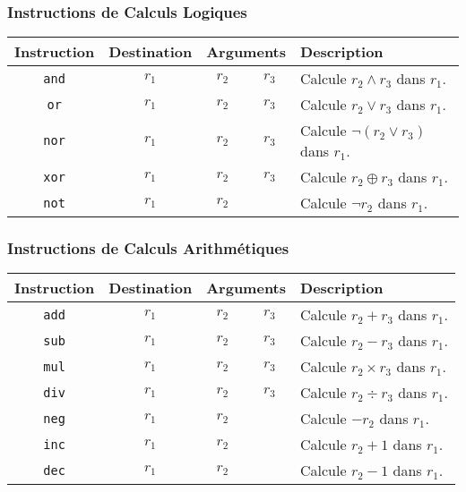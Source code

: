 \documentclass[french, 12pt]{article}
\begin{document}
\renewcommand\tabularxcolumn[1]{m{#1}}
\renewcommand{\arraystretch}{1.5}

\subsubsection*{Instructions de Calculs Logiques}
\noindent
\begin{tabularx}{\textwidth}{cccc X}
      \toprule
      Instruction  & Destination & \multicolumn{2}{c}{Arguments} & Description                                             \\
      \midrule
      \texttt{and} & $r_1$       & $r_2$                         & $r_3$       & Calcule $r_2 \land r_3$ dans $r_1$.       \\
      \texttt{or}  & $r_1$       & $r_2$                         & $r_3$       & Calcule $r_2 \lor r_3$ dans $r_1$.        \\
      \texttt{nor} & $r_1$       & $r_2$                         & $r_3$       & Calcule $\neg (r_2 \lor r_3)$ dans $r_1$. \\
      \texttt{xor} & $r_1$       & $r_2$                         & $r_3$       & Calcule $r_2 \oplus r_3$ dans $r_1$.      \\
      \texttt{not} & $r_1$       & $r_2$                         &             & Calcule $\neg r_2$ dans $r_1$.            \\
      \bottomrule
\end{tabularx}

\subsubsection*{Instructions de Calculs Arithmétiques}

\noindent
\begin{tabularx}{\textwidth}{cccc X}
      \toprule
      Instruction  & Destination & \multicolumn{2}{c}{Arguments} & Description                                        \\
      \midrule
      \texttt{add} & $r_1$       & $r_2$                         & $r_3$       & Calcule $r_2 + r_3$ dans $r_1$.      \\
      \texttt{sub} & $r_1$       & $r_2$                         & $r_3$       & Calcule $r_2 - r_3$ dans $r_1$.      \\
      \texttt{mul} & $r_1$       & $r_2$                         & $r_3$       & Calcule $r_2 \times r_3$ dans $r_1$. \\
      \texttt{div} & $r_1$       & $r_2$                         & $r_3$       & Calcule $r_2 \div r_3$ dans $r_1$.   \\
      \texttt{neg} & $r_1$       & $r_2$                         &             & Calcule $-r_2$ dans $r_1$.           \\
      \texttt{inc} & $r_1$       & $r_2$                         &             & Calcule $r_2 + 1$ dans $r_1$.        \\
      \texttt{dec} & $r_1$       & $r_2$                         &             & Calcule $r_2 - 1$ dans $r_1$.        \\
      \bottomrule
\end{tabularx}
\end{document}
